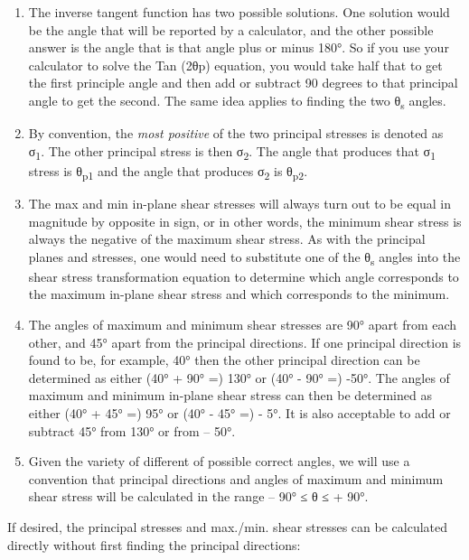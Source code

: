 \documentclass[
  letterpaper,
  DIV=11,
  numbers=noendperiod]{scrreprt}
\theoremstyle{definition}
\theoremstyle{remark}
\begin{document}
\begin{enumerate}
\def\labelenumi{\arabic{enumi}.}
\item
  The inverse tangent function has two possible solutions. One solution
  would be the angle that will be reported by a calculator, and the
  other possible answer is the angle that is that angle plus or minus
  180°. So if you use your calculator to solve the Tan (2θp) equation,
  you would take half that to get the first principle angle and then add
  or subtract 90 degrees to that principal angle to get the second. The
  same idea applies to finding the two θ\textsubscript{s} angles.
\item
  By convention, the \emph{most positive} of the two principal stresses
  is denoted as σ\textsubscript{1}. The other principal stress is then
  σ\textsubscript{2}. The angle that produces that σ\textsubscript{1}
  stress is θ\textsubscript{p1} and the angle that produces
  σ\textsubscript{2} is θ\textsubscript{p2}.
\item
  The max and min in-plane shear stresses will always turn out to be
  equal in magnitude by opposite in sign, or in other words, the minimum
  shear stress is always the negative of the maximum shear stress. As
  with the principal planes and stresses, one would need to substitute
  one of the θ\textsubscript{s} angles into the shear stress
  transformation equation to determine which angle corresponds to the
  maximum in-plane shear stress and which corresponds to the minimum.
\item
  The angles of maximum and minimum shear stresses are 90° apart from
  each other, and 45° apart from the principal directions. If one
  principal direction is found to be, for example, 40° then the other
  principal direction can be determined as either (40° + 90° =) 130° or
  (40° - 90° =) -50°. The angles of maximum and minimum in-plane shear
  stress can then be determined as either (40° + 45° =) 95° or (40° -
  45° =) - 5°. It is also acceptable to add or subtract 45° from 130° or
  from -- 50°.
\item
  Given the variety of different of possible correct angles, we will use
  a convention that principal directions and angles of maximum and
  minimum shear stress will be calculated in the range -- 90° ≤ θ ≤ +
  90°.
\end{enumerate}

If desired, the principal stresses and max./min. shear stresses can be
calculated directly without first finding the principal directions:
\end{document}
